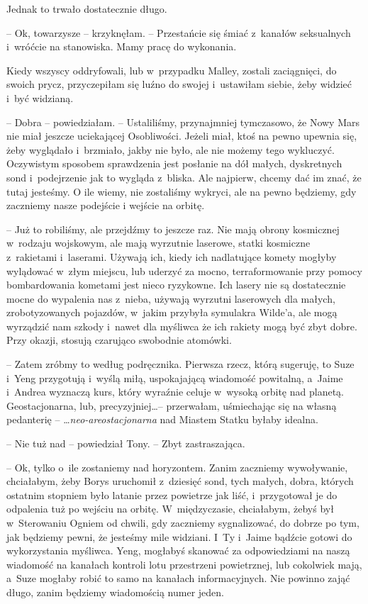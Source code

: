 \documentclass[oneside,polish,11pt,sfheadings]{mwbk}
\begin{document}
Jednak to trwało dostatecznie długo.

-- Ok, towarzysze -- krzyknęłam. -- Przestańcie się śmiać z~kanałów
seksualnych i~wróćcie na stanowiska. Mamy pracę do wykonania.

Kiedy wszyscy oddryfowali, lub w~przypadku Malley, zostali zaciągnięci,
do swoich prycz, przyczepiłam się luźno do swojej i~ustawiłam siebie,
żeby widzieć i~być widzianą.

-- Dobra -- powiedziałam. -- Ustaliliśmy, przynajmniej tymczasowo, że Nowy
Mars nie miał jeszcze uciekającej Osobliwości. Jeżeli miał, ktoś na
pewno upewnia się, żeby wyglądało i~brzmiało, jakby nie było, ale nie
możemy tego wykluczyć. Oczywistym sposobem sprawdzenia jest posłanie na
dół małych, dyskretnych sond i~podejrzenie jak to wygląda z~bliska. Ale
najpierw, chcemy dać im znać, że tutaj jesteśmy. O ile wiemy, nie
zostaliśmy wykryci, ale na pewno będziemy, gdy zaczniemy nasze podejście
i wejście na orbitę.

-- Już to robiliśmy, ale przejdźmy to jeszcze raz. Nie mają obrony
kosmicznej w~rodzaju wojskowym, ale mają wyrzutnie laserowe, statki
kosmiczne z~rakietami i~laserami. Używają ich, kiedy ich nadlatujące
komety mogłyby wylądować w~złym miejscu, lub uderzyć za mocno,
terraformowanie przy pomocy bombardowania kometami jest nieco ryzykowne.
Ich lasery nie są dostatecznie mocne do wypalenia nas z~nieba, używają
wyrzutni laserowych dla małych, zrobotyzowanych pojazdów, w~jakim
przybyła symulakra Wilde'a, ale mogą wyrządzić nam szkody i~nawet dla
myśliwca że ich rakiety mogą być zbyt dobre. Przy okazji, stosują
czarująco swobodnie atomówki.

-- Zatem zróbmy to według podręcznika. Pierwsza rzecz, którą sugeruję, to
Suze i~Yeng przygotują i~wyślą miłą, uspokajającą wiadomość powitalną, a~Jaime i~Andrea wyznaczą kurs, który wyraźnie celuje w~wysoką orbitę nad
planetą. Geostacjonarna, lub, precyzyjniej\ldots  -- przerwałam, uśmiechając
się na własną pedanterię -- \ldots  \textit{neo-areostacjonarna} nad Miastem
Statku byłaby idealna.

-- Nie tuż nad -- powiedział Tony. -- Zbyt zastraszająca.

-- Ok, tylko o~ile zostaniemy nad horyzontem. Zanim zaczniemy
wywoływanie, chciałabym, żeby Borys uruchomił z~dziesięć sond, tych
małych, dobra, których ostatnim stopniem było latanie przez powietrze
jak liść, i~przygotował je do odpalenia tuż po wejściu na orbitę. W~międzyczasie, chciałabym, żebyś był w~Sterowaniu Ogniem od chwili, gdy
zaczniemy sygnalizować, do dobrze po tym, jak będziemy pewni, że
jesteśmy mile widziani. I~Ty i~Jaime bądźcie gotowi do wykorzystania
myśliwca. Yeng, mogłabyś skanować za odpowiedziami na naszą wiadomość na
kanałach kontroli lotu przestrzeni powietrznej, lub cokolwiek mają, a~Suze mogłaby robić to samo na kanałach informacyjnych. Nie powinno zająć
długo, zanim będziemy wiadomością numer jeden.
\end{document}
